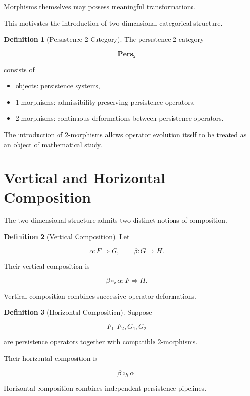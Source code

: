 \documentclass[11pt]{book}
\numberwithin{equation}{chapter}
\theoremstyle{definition}
\newtheorem{definition}{Definition}[chapter]
\theoremstyle{plain}
\begin{document}
Morphisms themselves may possess meaningful transformations.

This motivates the introduction of two-dimensional categorical
structure.

\begin{definition}[Persistence 2-Category]

The persistence 2-category

\[
\mathbf{Pers}_2
\]

consists of

\begin{itemize}

\item objects:
persistence systems,

\item 1-morphisms:
admissibility-preserving persistence operators,

\item 2-morphisms:
continuous deformations between persistence operators.

\end{itemize}

\end{definition}

The introduction of 2-morphisms allows operator evolution itself to be
treated as an object of mathematical study.

\section{Vertical and Horizontal Composition}

The two-dimensional structure admits two distinct notions of
composition.

\begin{definition}[Vertical Composition]

Let

\[
\alpha:
F
\Rightarrow
G,
\qquad
\beta:
G
\Rightarrow
H.
\]

Their vertical composition is

\[
\beta
\circ_v
\alpha:
F
\Rightarrow
H.
\]

\end{definition}

Vertical composition combines successive operator deformations.

\begin{definition}[Horizontal Composition]

Suppose

\[
F_1,F_2,G_1,G_2
\]

are persistence operators together with compatible
2-morphisms.

Their horizontal composition is

\[
\beta
\circ_h
\alpha.
\]

Horizontal composition combines independent persistence pipelines.

\end{definition}
\end{document}
